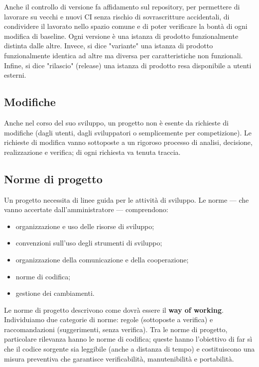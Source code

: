 \documentclass[a4paper]{article}
\begin{document}
		
Anche il controllo di versione fa affidamento sul repository, per permettere di lavorare su vecchi e nuovi CI senza rischio di sovrascritture accidentali, di condividere il lavorato nello spazio comune e di poter verificare la bontà di ogni modifica di baseline. Ogni versione è una istanza di prodotto funzionalmente distinta dalle altre. Invece, si dice "variante" una istanza di prodotto funzionalmente identica ad altre ma diversa per caratteristiche non funzionali. Infine, si dice "rilascio" (release) una istanza di prodotto resa disponibile a utenti esterni.

		
	\subsection{Modifiche}

		
Anche nel corso del suo sviluppo, un progetto non è esente da richieste di modifiche (dagli utenti, dagli sviluppatori o semplicemente per competizione). Le richieste di modifica vanno sottoposte a un rigoroso processo di analisi, decisione, realizzazione e verifica; di ogni richiesta va tenuta traccia.

		
	\subsection{Norme di progetto}

		
Un progetto necessita di linee guida per le attività di sviluppo. Le norme --- che vanno accertate dall'amministratore --- comprendono:
		
	\begin{itemize}
		
			
	\item organizzazione e uso delle risorse di sviluppo;
			
	\item convenzioni sull'uso degli strumenti di sviluppo;
			
	\item organizzazione della comunicazione e della cooperazione;
			
	\item norme di codifica;
			
	\item gestione dei cambiamenti.
		
	\end{itemize}

		
Le norme di progetto descrivono come dovrà essere il \textbf{way of working}. Individuiamo due categorie di norme: regole (sottoposte a verifica) e raccomandazioni (suggerimenti, senza verifica). Tra le norme di progetto, particolare rilevanza hanno le norme di codifica; queste hanno l'obiettivo di far sì che il codice sorgente sia leggibile (anche a distanza di tempo) e costituiscono una misura preventiva che garantisce verificabilità, manutenibilità e portabilità.
	
\end{document}
